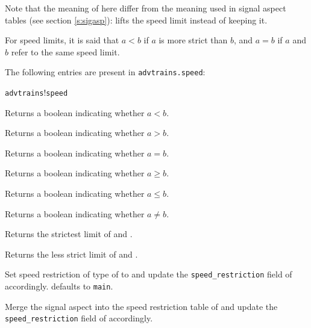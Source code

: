 Note that the meaning of \luanil{} here differ from the meaning used in signal aspect tables (see section \ref{s:sigasp}): \luanil{} lifts the speed limit instead of keeping it.

For speed limits, it is said that $a < b$ if $a$ is more strict than $b$, and $a = b$ if $a$ and $b$ refer to the same speed limit.

The following entries are present in \texttt{advtrains.speed}:

\begin{apidoc}{\texttt{advtrains}!\texttt{speed}}
\item {} Returns a boolean indicating whether $a < b$.
\item {} Returns a boolean indicating whether $a > b$.
\item {} Returns a boolean indicating whether $a = b$.
\item {} Returns a boolean indicating whether $a \ge b$.
\item {} Returns a boolean indicating whether $a \le b$.
\item {} Returns a boolean indicating whether $a \ne b$.
\item {} Returns the strictest limit of  and .
\item {} Returns the less strict limit of  and .
\item {} Set speed restriction of type  of  to  and update the \texttt{speed\_restriction} field of  accordingly.  defaults to \texttt{main}.
\item {} Merge the signal aspect  into the speed restriction table of  and update the \texttt{speed\_restriction} field of  accordingly.
\end{apidoc}

